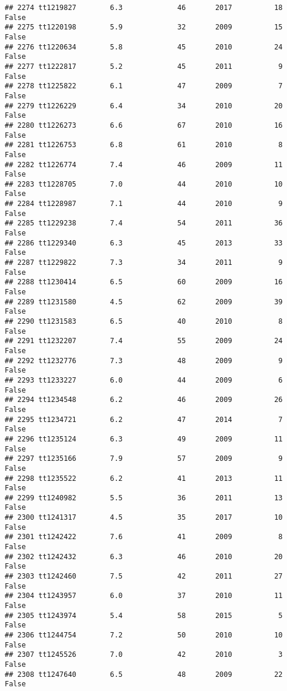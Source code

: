 \documentclass[
]{article}
\begin{document}
\begin{verbatim}
## 2274 tt1219827        6.3             46       2017          18   False
## 2275 tt1220198        5.9             32       2009          15   False
## 2276 tt1220634        5.8             45       2010          24   False
## 2277 tt1222817        5.2             45       2011           9   False
## 2278 tt1225822        6.1             47       2009           7   False
## 2279 tt1226229        6.4             34       2010          20   False
## 2280 tt1226273        6.6             67       2010          16   False
## 2281 tt1226753        6.8             61       2010           8   False
## 2282 tt1226774        7.4             46       2009          11   False
## 2283 tt1228705        7.0             44       2010          10   False
## 2284 tt1228987        7.1             44       2010           9   False
## 2285 tt1229238        7.4             54       2011          36   False
## 2286 tt1229340        6.3             45       2013          33   False
## 2287 tt1229822        7.3             34       2011           9   False
## 2288 tt1230414        6.5             60       2009          16   False
## 2289 tt1231580        4.5             62       2009          39   False
## 2290 tt1231583        6.5             40       2010           8   False
## 2291 tt1232207        7.4             55       2009          24   False
## 2292 tt1232776        7.3             48       2009           9   False
## 2293 tt1233227        6.0             44       2009           6   False
## 2294 tt1234548        6.2             46       2009          26   False
## 2295 tt1234721        6.2             47       2014           7   False
## 2296 tt1235124        6.3             49       2009          11   False
## 2297 tt1235166        7.9             57       2009           9   False
## 2298 tt1235522        6.2             41       2013          11   False
## 2299 tt1240982        5.5             36       2011          13   False
## 2300 tt1241317        4.5             35       2017          10   False
## 2301 tt1242422        7.6             41       2009           8   False
## 2302 tt1242432        6.3             46       2010          20   False
## 2303 tt1242460        7.5             42       2011          27   False
## 2304 tt1243957        6.0             37       2010          11   False
## 2305 tt1243974        5.4             58       2015           5   False
## 2306 tt1244754        7.2             50       2010          10   False
## 2307 tt1245526        7.0             42       2010           3   False
## 2308 tt1247640        6.5             48       2009          22   False

\end{verbatim}
\end{document}
